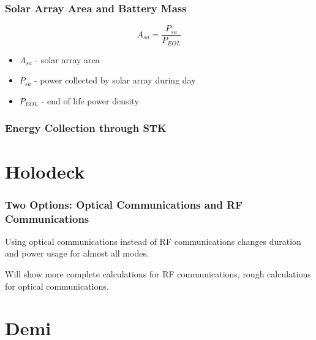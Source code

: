 \documentclass{beamer}
\begin{document}
\begin{frame}
  \frametitle{Solar Array Area and Battery Mass}
  \[A_{sa} = \frac{P_{sa}}{P_{EOL}}\]

  \begin{itemize}
    \item $A_{sa}$ - solar array area
    \item $P_{sa}$ - power collected by solar array during day
    \item $P_{EOL}$ - end of life power density
  \end{itemize}
\end{frame}

\begin{frame}
  \frametitle{Energy Collection through STK}
\end{frame}

\section{Holodeck}
\begin{frame}
  \frametitle{Two Options: Optical Communications and RF Communications}
  \begin{center}
    Using optical communications instead of RF communications changes
    duration and power usage for almost all modes.

    Will show more complete calculations for RF communications, rough
    calculations for optical communications.
  \end{center}
\end{frame}

\section{Demi}
\end{document}
